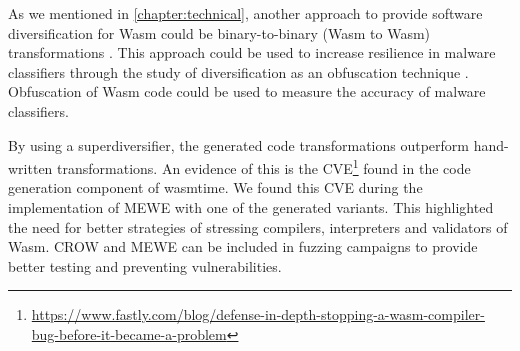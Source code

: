 As we mentioned in \autoref{chapter:technical}, another approach to provide software diversification for Wasm could be binary-to-binary (Wasm to Wasm) transformations \citationneeded. 
This approach could be used to increase resilience in malware classifiers through the study of diversification as an obfuscation technique \cite{10.1145/3507657.3528560}.
Obfuscation of Wasm code could be used to measure the accuracy of malware classifiers.

By using a superdiversifier, the generated code transformations outperform hand-written transformations. An evidence of this is the CVE\footnote{\url{https://www.fastly.com/blog/defense-in-depth-stopping-a-wasm-compiler-bug-before-it-became-a-problem}} found in the code generation component of wasmtime. 
We found this CVE during the implementation of MEWE with one of the generated variants.
This highlighted the need for better strategies of stressing compilers, interpreters and validators of Wasm.
CROW and MEWE can be included in fuzzing campaigns \citationneeded to provide better testing  and preventing vulnerabilities.